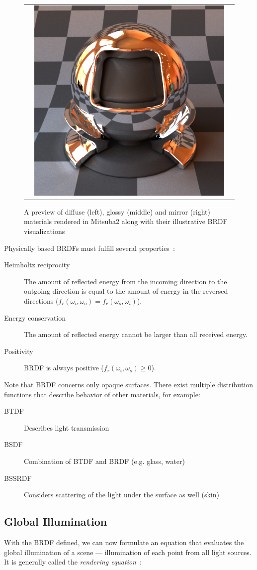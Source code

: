 \begin{figure}[httpb]
\begin{tabular}{ccc}
		&
		\includegraphics[width=.3\linewidth]{img/brdf_mirror.png}
	\end{tabular}
	\caption{A preview of diffuse (left), glossy (middle) and mirror (right) materials rendered in Mitsuba2 along with their illustrative BRDF visualizations}
	\label{fig:compare_brdf}
\end{figure}


Physically based BRDFs must fulfill several properties~\citealp{duvenhage2013numerical}:
\begin{description}
	\item[Heimholtz reciprocity] The amount of reflected energy from the incoming direction to the outgoing direction is equal to the amount of energy in the reversed directions ($f_r(\omega_i,\omega_o)=f_r(\omega_o,\omega_i)$).
	\item[Energy conservation] The amount of reflected energy cannot be larger than all received energy.
	\item[Positivity] BRDF is always positive ($f_r(\omega_i,\omega_o)\ge0$).
\end{description}

Note that BRDF concerns only opaque surfaces. There exist multiple distribution functions that describe behavior of other materials, for example:
\begin{description}
	\item[BTDF] Describes light transmission
	\item[BSDF] Combination of BTDF and BRDF (e.g. glass, water)
	\item[BSSRDF] Considers scattering of the light under the surface as well (skin)
\end{description}


\subsection{Global Illumination}

With the BRDF defined, we can now formulate an equation that evaluates the global illumination of a scene --- illumination of each point from all light sources. It is generally called the \emph{rendering equation}~\cite{kajiya1986rendering}:

